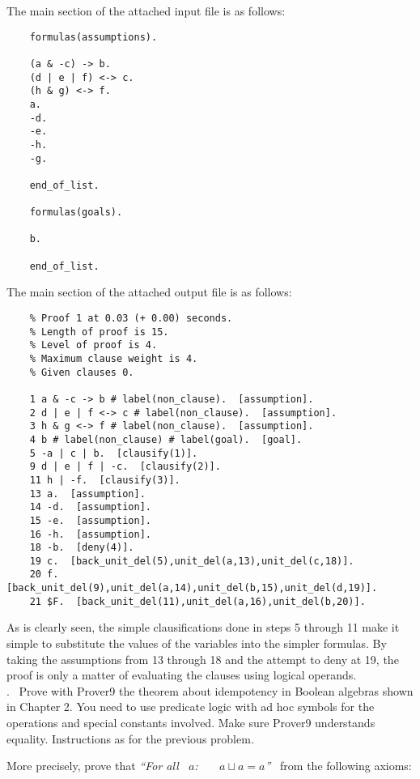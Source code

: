 \documentclass[fullpage]{article}
\begin{document}
The main section of the attached input file is as follows:

{\small
\begin{verbatim}
	formulas(assumptions).
	
	(a & -c) -> b.
	(d | e | f) <-> c.
	(h & g) <-> f.
	a.
	-d.
	-e.
	-h.
	-g.
	
	end_of_list.
	
	formulas(goals).
	
	b.
	
	end_of_list.
 \end{verbatim}
}
 The main section of the attached output file is as follows:

 {\footnotesize \begin{verbatim}
	% Proof 1 at 0.03 (+ 0.00) seconds.
	% Length of proof is 15.
	% Level of proof is 4.
	% Maximum clause weight is 4.
	% Given clauses 0.
	
	1 a & -c -> b # label(non_clause).  [assumption].
	2 d | e | f <-> c # label(non_clause).  [assumption].
	3 h & g <-> f # label(non_clause).  [assumption].
	4 b # label(non_clause) # label(goal).  [goal].
	5 -a | c | b.  [clausify(1)].
	9 d | e | f | -c.  [clausify(2)].
	11 h | -f.  [clausify(3)].
	13 a.  [assumption].
	14 -d.  [assumption].
	15 -e.  [assumption].
	16 -h.  [assumption].
	18 -b.  [deny(4)].
	19 c.  [back_unit_del(5),unit_del(a,13),unit_del(c,18)].
	20 f.  [back_unit_del(9),unit_del(a,14),unit_del(b,15),unit_del(d,19)].
	21 $F.  [back_unit_del(11),unit_del(a,16),unit_del(b,20)].
\end{verbatim} }

As is clearly seen, the simple clausifications done in steps 5 through 11 make it simple to substitute the values of the variables into the simpler formulas. By taking the assumptions from 13 through 18 and the attempt to deny at 19, the proof is only a matter of evaluating the clauses using logical operands.\\

. \ Prove with Prover9 the theorem about idempotency in Boolean algebras shown in Chapter 2. You need to use predicate logic with ad hoc symbols for the operations and special constants involved. Make sure Prover9 understands equality. Instructions as for the previous problem.

More precisely, prove that {\em ``For all \ $a$:~~~ $a \sqcup a
= a$''} \ from the following axioms:
\end{document}
